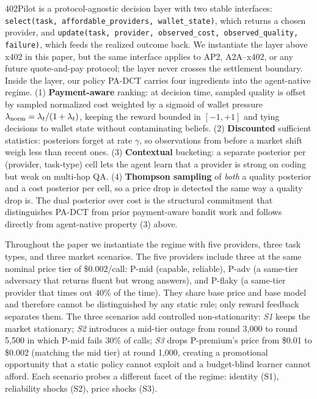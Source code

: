 402Pilot is a protocol-agnostic decision layer with two stable interfaces: \texttt{select(task, affordable\_providers, wallet\_state)}, which returns a chosen provider, and \texttt{update(task, provider, observed\_cost, observed\_quality, failure)}, which feeds the realized outcome back. We instantiate the layer above x402 in this paper, but the same interface applies to AP2, A2A--x402, or any future quote-and-pay protocol; the layer never crosses the settlement boundary. Inside the layer, our policy PA-DCT carries four ingredients into the agent-native regime. (1) \textbf{Payment-aware} ranking: at decision time, sampled quality is offset by sampled normalized cost weighted by a sigmoid of wallet pressure $\lambda_{\mathrm{norm}} = \lambda_t/(1+\lambda_t)$, keeping the reward bounded in $[-1,+1]$ and tying decisions to wallet state without contaminating beliefs. (2) \textbf{Discounted} sufficient statistics: posteriors forget at rate $\gamma$, so observations from before a market shift weigh less than recent ones. (3) \textbf{Contextual} bucketing: a separate posterior per (provider, task-type) cell lets the agent learn that a provider is strong on coding but weak on multi-hop QA. (4) \textbf{Thompson sampling} of \emph{both} a quality posterior and a cost posterior per cell, so a price drop is detected the same way a quality drop is. The dual posterior over cost is the structural commitment that distinguishes PA-DCT from prior payment-aware bandit work and follows directly from agent-native property (3) above.

Throughout the paper we instantiate the regime with five providers, three task types, and three market scenarios. The five providers include three at the same nominal price tier of \$0.002/call: P-mid (capable, reliable), P-adv (a same-tier adversary that returns fluent but wrong answers), and P-flaky (a same-tier provider that times out 40\% of the time). They share base price and base model and therefore cannot be distinguished by any static rule; only reward feedback separates them. The three scenarios add controlled non-stationarity: \emph{S1} keeps the market stationary; \emph{S2} introduces a mid-tier outage from round 3{,}000 to round 5{,}500 in which P-mid fails 30\% of calls; \emph{S3} drops P-premium's price from \$0.01 to \$0.002 (matching the mid tier) at round 1{,}000, creating a promotional opportunity that a static policy cannot exploit and a budget-blind learner cannot afford. Each scenario probes a different facet of the regime: identity (S1), reliability shocks (S2), price shocks (S3).

